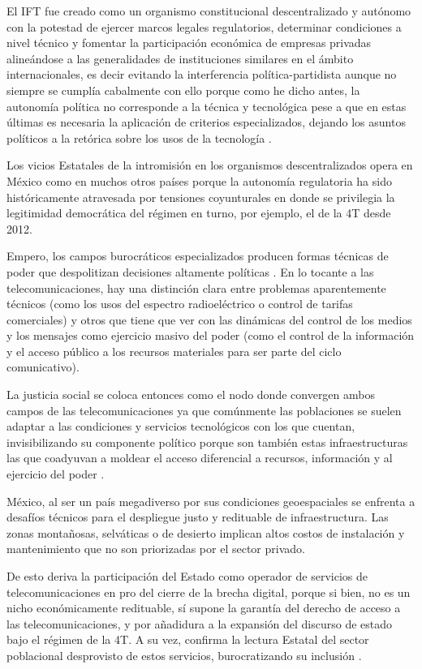 \documentclass[
  spanish,
  11pt,
  a4paper,
]{scrbook}
\begin{document}
El IFT fue creado como un organismo constitucional descentralizado y
autónomo con la potestad de ejercer marcos legales regulatorios,
determinar condiciones a nivel técnico y fomentar la participación
económica de empresas privadas alineándose a las generalidades de
instituciones similares en el ámbito internacionales, es decir evitando
la interferencia política-partidista aunque no siempre se cumplía
cabalmente con ello porque como he dicho antes, la autonomía política no
corresponde a la técnica y tecnológica pese a que en estas últimas es
necesaria la aplicación de criterios especializados, dejando los asuntos
políticos a la retórica sobre los usos de la tecnología
\autocite{Majone1997}.

Los vicios Estatales de la intromisión en los organismos
descentralizados opera en México como en muchos otros países porque la
autonomía regulatoria ha sido históricamente atravesada por tensiones
coyunturales en donde se privilegia la legitimidad democrática del
régimen en turno, por ejemplo, el de la 4T desde 2012.

Empero, los campos burocráticos especializados producen formas técnicas
de poder que despolitizan decisiones altamente políticas
\autocite{Bourdieu1998}. En lo tocante a las telecomunicaciones, hay una
distinción clara entre problemas aparentemente técnicos (como los usos
del espectro radioeléctrico o control de tarifas comerciales) y otros
que tiene que ver con las dinámicas del control de los medios y los
mensajes como ejercicio masivo del poder (como el control de la
información y el acceso público a los recursos materiales para ser parte
del ciclo comunicativo).

La justicia social se coloca entonces como el nodo donde convergen ambos
campos de las telecomunicaciones ya que comúnmente las poblaciones se
suelen adaptar a las condiciones y servicios tecnológicos con los que
cuentan, invisibilizando su componente político porque son también estas
infraestructuras las que coadyuvan a moldear el acceso diferencial a
recursos, información y al ejercicio del poder
\autocite{Star1999,Larkin2013}.

México, al ser un país megadiverso por sus condiciones geoespaciales se
enfrenta a desafíos técnicos para el despliegue justo y redituable de
infraestructura. Las zonas montañosas, selváticas o de desierto implican
altos costos de instalación y mantenimiento que no son priorizadas por
el sector privado.

De esto deriva la participación del Estado como operador de servicios de
telecomunicaciones en pro del cierre de la brecha digital, porque si
bien, no es un nicho económicamente redituable, sí supone la garantía
del derecho de acceso a las telecomunicaciones, y por añadidura a la
expansión del discurso de estado bajo el régimen de la 4T. A su vez,
confirma la lectura Estatal del sector poblacional desprovisto de estos
servicios, burocratizando su inclusión \autocite{Scott1998}.
\end{document}
